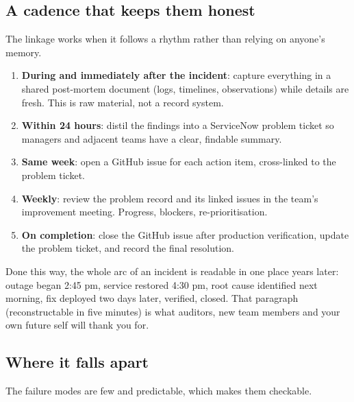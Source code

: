 \subsection{A cadence that keeps them honest}


The linkage works when it follows a rhythm rather than relying on anyone's memory.


\begin{enumerate}[leftmargin=*]
\item \textbf{During and immediately after the incident}: capture everything in a shared post-mortem document (logs, timelines, observations) while details are fresh. This is raw material, not a record system.
\item \textbf{Within 24 hours}: distil the findings into a ServiceNow problem ticket so managers and adjacent teams have a clear, findable summary.
\item \textbf{Same week}: open a GitHub issue for each action item, cross-linked to the problem ticket.
\item \textbf{Weekly}: review the problem record and its linked issues in the team's improvement meeting. Progress, blockers, re-prioritisation.
\item \textbf{On completion}: close the GitHub issue after production verification, update the problem ticket, and record the final resolution.
\end{enumerate}

Done this way, the whole arc of an incident is readable in one place years later: outage began 2:45 pm, service restored 4:30 pm, root cause identified next morning, fix deployed two days later, verified, closed. That paragraph (reconstructable in five minutes) is what auditors, new team members and your own future self will thank you for.



\subsection{Where it falls apart}


The failure modes are few and predictable, which makes them checkable.


